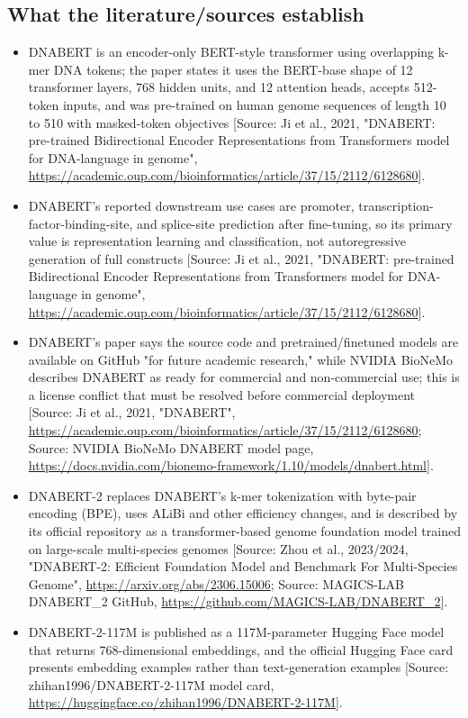 \documentclass[11pt]{report}
\begin{document}
\subsection{What the literature/sources establish}
\begin{itemize}
\item DNABERT is an encoder-only BERT-style transformer using overlapping k-mer DNA tokens; the paper states it uses the BERT-base shape of 12 transformer layers, 768 hidden units, and 12 attention heads, accepts 512-token inputs, and was pre-trained on human genome sequences of length 10 to 510 with masked-token objectives [Source: Ji et al., 2021, "DNABERT: pre-trained Bidirectional Encoder Representations from Transformers model for DNA-language in genome", \url{https://academic.oup.com/bioinformatics/article/37/15/2112/6128680}].
\item DNABERT's reported downstream use cases are promoter, transcription-factor-binding-site, and splice-site prediction after fine-tuning, so its primary value is representation learning and classification, not autoregressive generation of full constructs [Source: Ji et al., 2021, "DNABERT: pre-trained Bidirectional Encoder Representations from Transformers model for DNA-language in genome", \url{https://academic.oup.com/bioinformatics/article/37/15/2112/6128680}].
\item DNABERT's paper says the source code and pretrained/finetuned models are available on GitHub "for future academic research," while NVIDIA BioNeMo describes DNABERT as ready for commercial and non-commercial use; this is a license conflict that must be resolved before commercial deployment [Source: Ji et al., 2021, "DNABERT", \url{https://academic.oup.com/bioinformatics/article/37/15/2112/6128680}; Source: NVIDIA BioNeMo DNABERT model page, \url{https://docs.nvidia.com/bionemo-framework/1.10/models/dnabert.html}].
\item DNABERT-2 replaces DNABERT's k-mer tokenization with byte-pair encoding (BPE), uses ALiBi and other efficiency changes, and is described by its official repository as a transformer-based genome foundation model trained on large-scale multi-species genomes [Source: Zhou et al., 2023/2024, "DNABERT-2: Efficient Foundation Model and Benchmark For Multi-Species Genome", \url{https://arxiv.org/abs/2306.15006}; Source: MAGICS-LAB DNABERT\_2 GitHub, \url{https://github.com/MAGICS-LAB/DNABERT_2}].
\item DNABERT-2-117M is published as a 117M-parameter Hugging Face model that returns 768-dimensional embeddings, and the official Hugging Face card presents embedding examples rather than text-generation examples [Source: zhihan1996/DNABERT-2-117M model card, \url{https://huggingface.co/zhihan1996/DNABERT-2-117M}].

\end{itemize}
\end{document}

